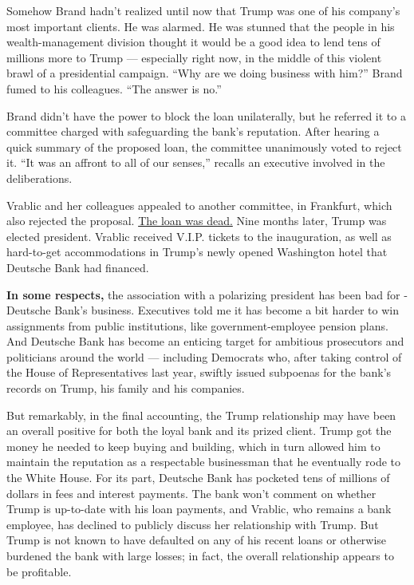 Somehow Brand hadn't realized until now that Trump was one of his
company's most important clients. He was alarmed. He was stunned that
the people in his wealth-­management division thought it would be a good
idea to lend tens of millions more to Trump --- especially right now, in
the middle of this violent brawl of a presidential campaign. ``Why are
we doing business with him?'' Brand fumed to his colleagues. ``The
answer is no.''

Brand didn't have the power to block the loan unilaterally, but he
referred it to a committee charged with safeguarding the bank's
reputation. After hearing a quick summary of the proposed loan, the
committee unanimously voted to reject it. ``It was an affront to all of
our senses,'' recalls an executive involved in the deliberations.

Vrablic and her colleagues appealed to another committee, in Frankfurt,
which also rejected the proposal.
\href{https://www.nytimes3xbfgragh.onion/2019/02/02/business/trump-deutsche-bank.html}{The
loan was dead.} Nine months later, Trump was elected president. Vrablic
received V.I.P. tickets to the inauguration, as well as hard-to-get
accommodations in Trump's newly opened Washington hotel that Deutsche
Bank had financed.

\textbf{In some respects,} the association with a polarizing president
has been bad for ­Deutsche Bank's business. Executives told me it has
become a bit harder to win assignments from public institutions, like
government-­employee pension plans. And ­Deutsche Bank has become an
enticing target for ambitious prosecutors and politicians around the
world --- including Democrats who, after taking control of the House of
Representatives last year, swiftly issued subpoenas for the bank's
records on Trump, his family and his companies.

But remarkably, in the final accounting, the Trump relationship may have
been an overall positive for both the loyal bank and its prized client.
Trump got the money he needed to keep buying and building, which in turn
allowed him to maintain the reputation as a respectable businessman that
he eventually rode to the White House. ­For its part, Deutsche Bank has
pocketed tens of millions of dollars in fees and interest payments. The
bank won't comment on whether Trump is up-to-date with his loan
payments, and Vrablic, who remains a bank employee, has declined to
publicly discuss her relationship with Trump. But Trump is not known to
have defaulted on any of his recent loans or otherwise burdened the bank
with large losses; in fact, the overall relationship appears to be
profitable.

